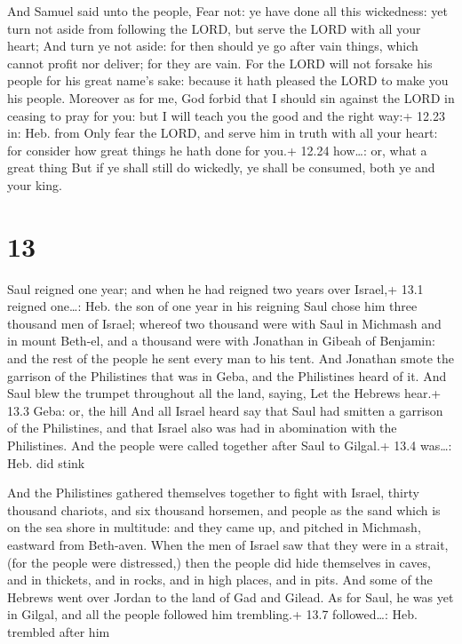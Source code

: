  And Samuel said unto the people, Fear not: ye have done
all this wickedness: yet turn not aside from following the LORD, but
serve the LORD with all your heart;  And turn ye not aside:
for then should ye go after vain things, which cannot profit nor
deliver; for they are vain.  For the LORD will not forsake
his people for his great name's sake: because it hath pleased the LORD
to make you his people.  Moreover as for me, God forbid
that I should sin against the LORD in ceasing to pray for you: but I
will teach you the good and the right way:+ 12.23 in: Heb. from
 Only fear the LORD, and serve him in truth with all your
heart: for consider how great things he hath done for you.+ 12.24
how\ldots: or, what a great thing  But if ye shall still do
wickedly, ye shall be consumed, both ye and your king.

\hypertarget{section-12}{%
\section{13}\label{section-12}}

 Saul reigned one year; and when he had reigned two years
over Israel,+ 13.1 reigned one\ldots: Heb. the son of one year in his
reigning  Saul chose him three thousand men of Israel;
whereof two thousand were with Saul in Michmash and in mount Beth-el,
and a thousand were with Jonathan in Gibeah of Benjamin: and the rest of
the people he sent every man to his tent.  And Jonathan
smote the garrison of the Philistines that was in Geba, and the
Philistines heard of it. And Saul blew the trumpet throughout all the
land, saying, Let the Hebrews hear.+ 13.3 Geba: or, the hill
 And all Israel heard say that Saul had smitten a garrison
of the Philistines, and that Israel also was had in abomination with the
Philistines. And the people were called together after Saul to Gilgal.+
13.4 was\ldots: Heb. did stink

 And the Philistines gathered themselves together to fight
with Israel, thirty thousand chariots, and six thousand horsemen, and
people as the sand which is on the sea shore in multitude: and they came
up, and pitched in Michmash, eastward from Beth-aven.  When
the men of Israel saw that they were in a strait, (for the people were
distressed,) then the people did hide themselves in caves, and in
thickets, and in rocks, and in high places, and in pits. 
And some of the Hebrews went over Jordan to the land of Gad and Gilead.
As for Saul, he was yet in Gilgal, and all the people followed him
trembling.+ 13.7 followed\ldots: Heb. trembled after him

